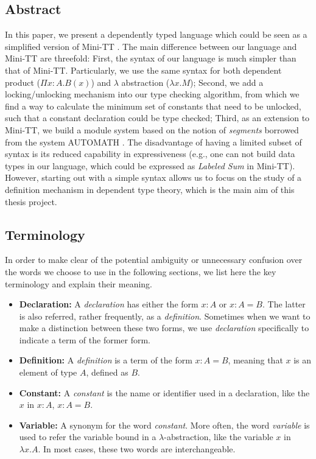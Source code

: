 \documentclass{article}
\theoremstyle{remark}
\begin{document}
\subsection{Abstract}
In this paper, we present a dependently typed language which could be seen as a simplified version of Mini-TT \cite{coquand2009simple}. The main difference between our language and Mini-TT are threefold: First, the syntax of our language is much simpler than that of Mini-TT. Particularly, we use the same syntax for both dependent product ($\Pi x:A.B(x)$) and $\lambda$ abstraction ($\lambda x . M$); Second, we add a locking/unlocking mechanism into our type checking algorithm, from which we find a way to calculate the minimum set of constants that need to be unlocked, such that a constant declaration could be type checked; Third, as an extension to Mini-TT, we build a module system based on the notion of \emph{segments} borrowed from the system AUTOMATH \cite{de1994survey}. The disadvantage of having a limited subset of syntax is its reduced capability in expressiveness (e.g., one can not build data types in our language, which could be expressed as \emph{Labeled Sum} in Mini-TT). However, starting out with a simple syntax allows us to focus on the study of a definition mechanism in dependent type theory, which is the main aim of this thesis project. 

\subsection{Terminology}
In order to make clear of the potential ambiguity or unnecessary confusion over the words we choose to use in the following sections, we list here the key terminology and explain their meaning.
\begin{itemize}
  \item \textbf{Declaration:} A \emph{declaration} has either the form $x : A$ or $x : A = B$. The latter is also referred, rather frequently, as a \emph{definition}. Sometimes when we want to make a distinction between these two forms, we use \emph{declaration} specifically to indicate a term of the former form. 
  \item \textbf{Definition:} A \emph{definition} is a term of the form $x : A = B$, meaning that $x$ is an element of type $A$, defined as $B$.
  \item \textbf{Constant:} A \emph{constant} is the name or identifier used in a declaration, like the $x$ in $x : A$, $x : A = B$.
  \item \textbf{Variable:} A synonym for the word \emph{constant}. More often, the word \emph{variable} is used to refer the variable bound in a $\lambda$-abstraction, like the variable $x$ in $\lambda x . A$. In most cases, these two words are interchangeable. 
\end{itemize}
\end{document}

